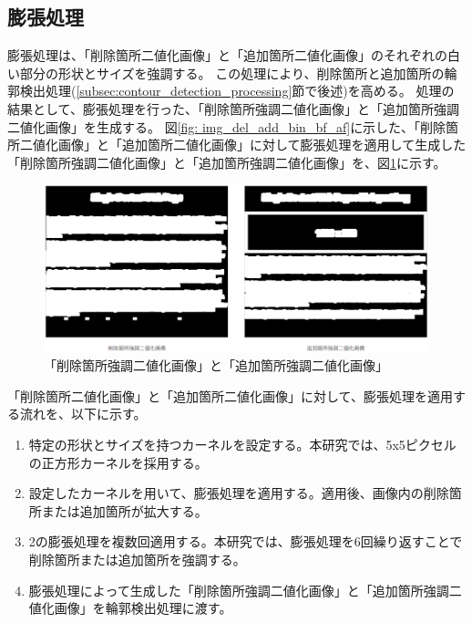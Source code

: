 \subsection{膨張処理}\label{subsec:dilation}
膨張処理は、「削除箇所二値化画像」と「追加箇所二値化画像」のそれぞれの白い部分の形状とサイズを強調する。
この処理により、削除箇所と追加箇所の輪郭検出処理(\ref{subsec:contour_detection_processing}節で後述)を高める。
処理の結果として、膨張処理を行った、「削除箇所強調二値化画像」と「追加箇所強調二値化画像」を生成する。
図\ref{fig: img_del_add_bin_bf_af}に示した、「削除箇所二値化画像」と「追加箇所二値化画像」に対して膨張処理を適用して生成した「削除箇所強調二値化画像」と「追加箇所強調二値化画像」を、図\ref{fig: img_del_add_highlight_bin}に示す。
\begin{figure}[tp]
    \begin{center}
        \includegraphics[width=1.0\columnwidth]{image/4_img_del_add_highlight_bin.png}
        \caption{「削除箇所強調二値化画像」と「追加箇所強調二値化画像」}
        \label{fig: img_del_add_highlight_bin}
    \end{center}
\end{figure}
\par
「削除箇所二値化画像」と「追加箇所二値化画像」に対して、膨張処理を適用する流れを、以下に示す。
\begin{enumerate}
    \item 特定の形状とサイズを持つカーネルを設定する。本研究では、5x5ピクセルの正方形カーネルを採用する。
    \item 設定したカーネルを用いて、膨張処理を適用する。適用後、画像内の削除箇所または追加箇所が拡大する。
    \item 2の膨張処理を複数回適用する。本研究では、膨張処理を6回繰り返すことで削除箇所または追加箇所を強調する。
    \item 膨張処理によって生成した「削除箇所強調二値化画像」と「追加箇所強調二値化画像」を輪郭検出処理に渡す。
\end{enumerate}

